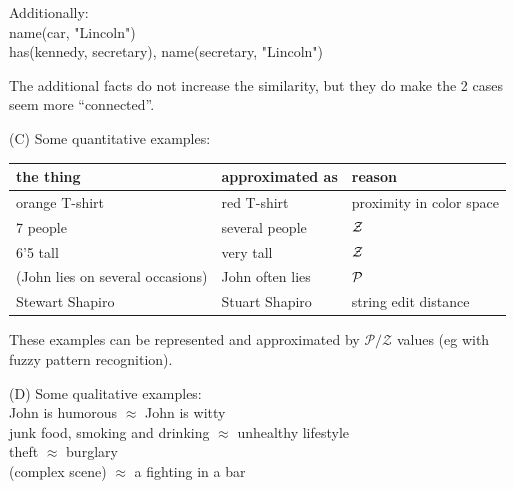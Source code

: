 Additionally:\\
\hspace*{1cm} name(car, "Lincoln")\\
\hspace*{1cm} has(kennedy, secretary), name(secretary, "Lincoln")

The additional facts do not increase the similarity, but they do make the 2 cases seem more ``connected''.

\underconst

(C) Some quantitative examples:\\
\hspace*{1cm} \begin{tabular}{|l|l|l|}
\hline
\textbf{the thing} & \textbf{approximated as} & \textbf{reason}\\
\hline
orange T-shirt     & red T-shirt      & proximity in color space\\
7 people           & several people   & $\mathcal{Z}$\\
6'5 tall           & very tall        & $\mathcal{Z}$\\
(John lies on several occasions) & John often lies & $\mathcal{P}$\\
Stewart Shapiro    & Stuart Shapiro   & string edit distance\\
\hline
\end{tabular}

These examples can be represented and approximated by $\mathcal{P/Z}$ values (eg with fuzzy pattern recognition).


(D) Some qualitative examples:\\
\hspace*{1cm} John is humorous $\approx$ John is witty\\
\hspace*{1cm} junk food, smoking and drinking $\approx$ unhealthy lifestyle\\
\hspace*{1cm} theft $\approx$ burglary\\
\hspace*{1cm} (complex scene) $\approx$ a fighting in a bar

